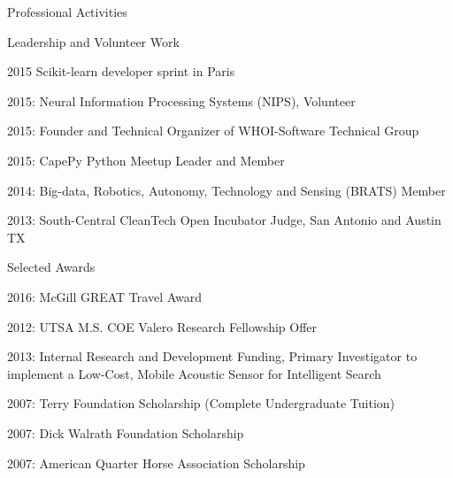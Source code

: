 \documentclass{resume} %
\begin{document}
\begin{rSection}{Professional Activities}
\begin{rSubsection}{Leadership and Volunteer Work}{}{}{}
\item{2015 Scikit-learn developer sprint in Paris}
\item{2015: Neural Information Processing Systems (NIPS), Volunteer}
\item{2015: Founder and Technical Organizer of WHOI-Software Technical Group}
\item{2015: CapePy Python Meetup Leader and Member}
\item{2014: Big-data, Robotics, Autonomy, Technology and Sensing (BRATS) Member}
\item{2013: South-Central CleanTech Open Incubator Judge, San Antonio and Austin TX}
\end{rSubsection}

\begin{rSubsection}{Selected Awards}{}{}{}
\item{2016: McGill GREAT Travel Award} 
\item{2012: UTSA M.S. COE Valero Research Fellowship Offer } 
\item{2013: Internal Research and Development Funding, Primary Investigator to implement a Low-Cost, Mobile Acoustic Sensor for Intelligent Search} 
\item{2007: Terry Foundation Scholarship (Complete Undergraduate Tuition)} 
\item{2007: Dick Walrath Foundation Scholarship} 
\item{2007: American Quarter Horse Association Scholarship} 
\end{rSubsection}


\end{rSection}


\end{document}
